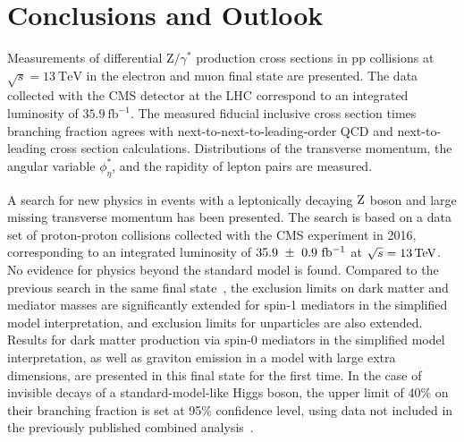\chapter{Conclusions and Outlook}
Measurements of differential $\mathrm{Z}/\gamma^{*}$ production cross
sections in $\mathrm{p}\mathrm{p}$ collisions at $\sqrt{s}
=13~\mathrm{TeV}$ in the electron and muon final state are presented. 
The data collected with the CMS detector at the LHC correspond to an
integrated luminosity of $35.9~\mathrm{fb}^{-1}$. The measured fiducial
inclusive cross section times branching fraction agrees with next-to-next-to-leading-order QCD and
next-to-leading cross section calculations. 
Distributions of the transverse momentum, the angular variable $\phi^{*}_\eta$, and the
rapidity of lepton pairs are measured.

A search for new physics in events with a leptonically decaying $\mathrm{Z}$ boson and large missing transverse momentum has been presented.
The search is based on a data set of proton-proton collisions collected with the CMS experiment in 2016, corresponding to an integrated luminosity of $35.9~\pm~0.9~\mathrm{fb^{-1}}$ at $\sqrt{s} = 13\,\text{Te\hspace{-.08em}V}$.
No evidence for physics beyond the standard model is found.
Compared to the previous search in the same final state~\cite{CMS-PAPER-EXO-16-010}, the exclusion limits on dark matter and mediator masses are significantly extended for spin-1 mediators in the simplified model interpretation, and exclusion limits for unparticles are also extended.
Results for dark matter production via spin-0 mediators in the simplified model interpretation, as well as graviton emission in a model with large extra dimensions, are presented in this final state for the first time.
In the case of invisible decays of a standard-model-like Higgs boson, the upper limit of 40\% on their branching fraction is set at 95\% confidence level, using data not included in the previously published combined analysis~\cite{CMS-PAPER-HIG-16-016}.

